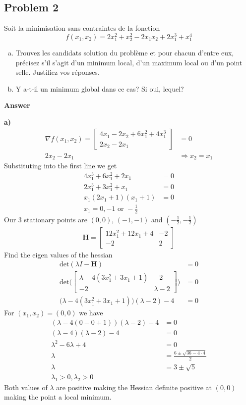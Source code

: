 \pagebreak
\subsection{Problem 2}

Soit la minimisation sans contraintes de la fonction
\[
f(x_1,x_2) = 2x_1^2 + x_2^2 -2x_1x_2 + 2x_1^3 + x_1^4
\]
\begin{enumerate}[(a)]
\item Trouvez les candidats solution du problème et pour chacun d’entre eux, précisez s’il s’agit d’un minimum local, d’un maximum local ou d’un point selle. Justifiez vos réponses.
\item Y a-t-il un minimum global dans ce cas? Si oui, lequel?
\end{enumerate}

\textbf{Answer}

\textbf{a)}
\begin{align*}
\nabla f(x_1, x_2) =
\begin{bmatrix}
4x_1 - 2x_2 + 6x_1^2 + 4x_1^3 \\
2x_2 - 2x_1
\end{bmatrix} &= 0\\
2x_2 - 2x_1 &\Rightarrow x_2 = x_1
\end{align*}
Substituting into the first line we get
\begin{align*}
	4x_1^3 + 6x_1^2 + 2x_1 &= 0 \\
	2x_1^3 + 3x_1^2 + x_1 &= 0 \\
	x_1(2x_1+1)(x_1+1) &=0 \\
	x_1 = 0, -1 \text{ or } -\frac{1}{2}
\end{align*}
Our 3 stationary points are $(0,0)$, $(-1,-1)$ and $(-\frac{1}{2}, -\frac{1}{2})$
\begin{align*}
\textbf{H} = 
\begin{bmatrix}
	12x_1^2 + 12x_1 + 4 & -2 \\
	-2 & 2
\end{bmatrix}
\end{align*}
Find the eigen values of the hessian
\begin{align*}
\text{det}(\lambda I - \textbf{H}) &= 0 \\
\text{det}\Bigg( 
\begin{bmatrix}
	\lambda -4(3x_1^2 + 3 x_1 + 1) & -2 \\
	-2 & \lambda -2
\end{bmatrix}
\Bigg) &= 0 \\
\Big(\lambda -4(3x_1^2 + 3 x_1 + 1)\Big)(\lambda -2) -4 &= 0
\end{align*}
For $(x_1, x_2) = (0,0)$ we have
\begin{align*}
	(\lambda-4(0-0+1))(\lambda -2 ) -4 &= 0 \\
	(\lambda -4)(\lambda -2) -4 &= 0 \\
	\lambda^2 - 6\lambda + 4 &= 0 \\
	\lambda &= \frac{6 \pm \sqrt{36 - 4 \cdot 4}}{2} \\
	\lambda &= 3 \pm \sqrt{5} \\
	\lambda_1 > 0, \lambda_2 >0
\end{align*}
Both values of $\lambda$ are positive making the Hessian definite positive at $(0,0)$ making the point a local minimum.

